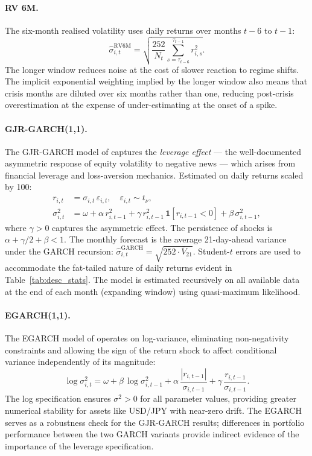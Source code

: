 \documentclass[12pt, a4paper]{article}
\newcommand{\shat}{\hat{\sigma}}
\begin{document}
\paragraph{RV 6M.} The six-month realised volatility uses daily returns over months $t-6$
to $t-1$:
\begin{equation}
  \shat^{\mathrm{RV6M}}_{i,t} = \sqrt{\frac{252}{N_{t}} \sum_{s=\tau_{t-6}}^{\tau_{t-1}} r_{i,s}^2}.
\end{equation}
The longer window reduces noise at the cost of slower reaction to regime shifts. The
implicit exponential weighting implied by the longer window also means that crisis months
are diluted over six months rather than one, reducing post-crisis overestimation at the
expense of under-estimating at the onset of a spike.

\paragraph{GJR-GARCH(1,1).} The GJR-GARCH model of \citet{Glosten1993} captures the
\emph{leverage effect} --- the well-documented asymmetric response of equity volatility
to negative news --- which arises from financial leverage and loss-aversion mechanics.
Estimated on daily returns scaled by 100:
\begin{align}
  r_{i,t} &= \sigma_{i,t}\,\varepsilon_{i,t}, \quad \varepsilon_{i,t} \sim t_\nu, \\
  \sigma_{i,t}^2 &= \omega + \alpha\, r_{i,t-1}^2
                   + \gamma\, r_{i,t-1}^2\,\mathbf{1}[r_{i,t-1}<0]
                   + \beta\,\sigma_{i,t-1}^2,
\end{align}
where $\gamma > 0$ captures the asymmetric effect. The persistence of shocks is
$\alpha + \gamma/2 + \beta < 1$. The monthly forecast is the average 21-day-ahead
variance under the GARCH recursion:
$\shat^{\mathrm{GARCH}}_{i,t} = \sqrt{252 \cdot \overline{V}_{21}}$.
Student-$t$ errors are used to accommodate the fat-tailed nature of daily returns evident
in Table~\ref{tab:desc_stats}. The model is estimated recursively on all available data
at the end of each month (expanding window) using quasi-maximum likelihood.

\paragraph{EGARCH(1,1).} The EGARCH model of \citet{Nelson1991} operates on
log-variance, eliminating non-negativity constraints and allowing the sign of the
return shock to affect conditional variance independently of its magnitude:
\begin{equation}
  \log\sigma_{i,t}^2 = \omega + \beta\,\log\sigma_{i,t-1}^2
                        + \alpha\,\frac{|r_{i,t-1}|}{\sigma_{i,t-1}}
                        + \gamma\,\frac{r_{i,t-1}}{\sigma_{i,t-1}}.
\end{equation}
The log specification ensures $\sigma^2 > 0$ for all parameter values, providing greater
numerical stability for assets like USD/JPY with near-zero drift. The EGARCH serves as a
robustness check for the GJR-GARCH results; differences in portfolio performance between
the two GARCH variants provide indirect evidence of the importance of the leverage
specification.
\end{document}
